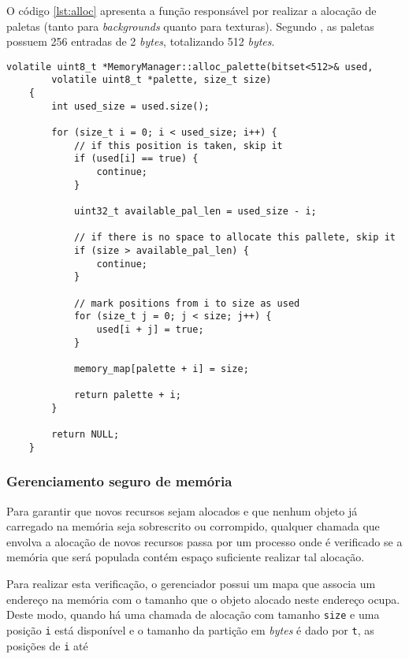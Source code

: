     O código \ref{lst:alloc} apresenta a função responsável por realizar a alocação de paletas (tanto para \textit{backgrounds} quanto para texturas). Segundo , as paletas possuem 256 entradas de 2 \textit{bytes}, totalizando 512 \textit{bytes}.

    \begin{lstlisting}[float,caption={Código de alocação de paletas para \textit{backgrounds} e texturas.},label={lst:alloc}]
    volatile uint8_t *MemoryManager::alloc_palette(bitset<512>& used,
        volatile uint8_t *palette, size_t size)
    {
        int used_size = used.size();

        for (size_t i = 0; i < used_size; i++) {
            // if this position is taken, skip it
            if (used[i] == true) {
                continue;
            }

            uint32_t available_pal_len = used_size - i;

            // if there is no space to allocate this pallete, skip it
            if (size > available_pal_len) {
                continue;
            }

            // mark positions from i to size as used
            for (size_t j = 0; j < size; j++) {
                used[i + j] = true;
            }

            memory_map[palette + i] = size;

            return palette + i;
        }

        return NULL;
    }
    \end{lstlisting}


    \subsubsection{Gerenciamento seguro de memória}

    Para garantir que novos recursos sejam alocados e que nenhum objeto já carregado na memória seja sobrescrito ou corrompido, qualquer chamada que envolva a alocação de novos recursos passa por um processo onde é verificado se a memória que será populada contém espaço suficiente realizar tal alocação.

    Para realizar esta verificação, o gerenciador possui um mapa que associa um endereço na memória com o tamanho que o objeto alocado neste endereço ocupa. Deste modo, quando há uma chamada de alocação com tamanho \texttt{size} e uma posição \texttt{i} está disponível e o tamanho da partição em \textit{bytes} é dado por \texttt{t}, as posições de \texttt{i} até

